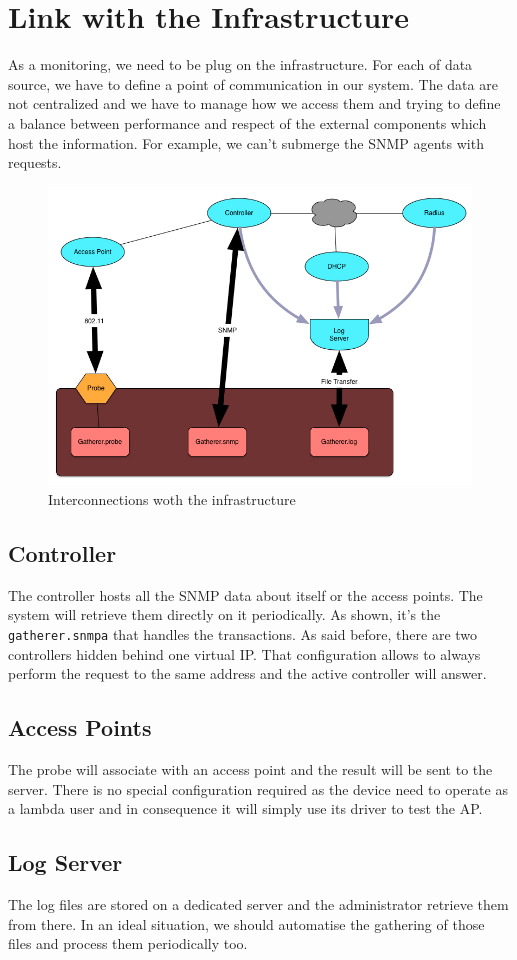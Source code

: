 \section{Link with the Infrastructure}
As a monitoring, we need to be plug on the infrastructure. For each of data source, we have to define a point of communication in our system. The data are not centralized and we have to manage how we access them and trying to define a balance between performance and respect of the external components which host the information. For example, we can't submerge the SNMP agents with requests.

\begin{figure}[H]
\centering
	\includegraphics[width=1\linewidth]{Pictures/chapter4/interactions.jpg}
	\caption{Interconnections woth the infrastructure}
\end{figure}

\subsection{Controller}
The controller hosts all the SNMP data about itself or the access points. The system will retrieve them directly on it periodically. As shown, it's the \texttt{gatherer.snmpa} that handles the transactions. As said before, there are two controllers hidden behind one virtual IP. That configuration allows to always perform the request to the same address and the active controller will answer.
\subsection{Access Points}
The probe will associate with an access point and the result will be sent to the server. There is no special configuration required as the device need to operate as a lambda user and in consequence it will simply use its driver to test the AP. 
\subsection{Log Server} 
The log files are stored on a dedicated server and the administrator retrieve them from there. In an ideal situation, we should automatise the gathering of those files and process them periodically too.
